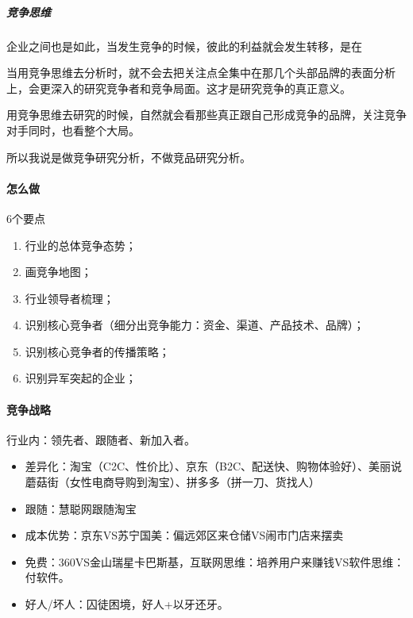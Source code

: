 \documentclass[letterpaper,10pt,english]{sphinxmanual}
\begin{document}
\subparagraph{竞争思维}
\label{\detokenize{chapter_knowledge/compete_analysis:id4}}
企业之间也是如此，当发生竞争的时候，彼此的利益就会发生转移，是在

当用竞争思维去分析时，就不会去把关注点全集中在那几个头部品牌的表面分析上，会更深入的研究竞争者和竞争局面。这才是研究竞争的真正意义。

用竞争思维去研究的时候，自然就会看那些真正跟自己形成竞争的品牌，关注竞争对手同时，也看整个大局。

所以我说是做竞争研究分析，不做竞品研究分析。%
\begin{footnote}[551]\sphinxAtStartFootnote
{}
%
\end{footnote}


\paragraph{怎么做}
\label{\detokenize{chapter_knowledge/compete_analysis:id5}}
6个要点
\begin{enumerate}
%
\item {} 
行业的总体竞争态势；

\item {} 
画竞争地图；

\item {} 
行业领导者梳理；

\item {} 
识别核心竞争者（细分出竞争能力：资金、渠道、产品技术、品牌）；

\item {} 
识别核心竞争者的传播策略；

\item {} 
识别异军突起的企业；

\end{enumerate}


\paragraph{竞争战略}
\label{\detokenize{chapter_knowledge/compete_analysis:id6}}
行业内：领先者、跟随者、新加入者。
\begin{itemize}
\item {} 
差异化：淘宝（C2C、性价比）、京东（B2C、配送快、购物体验好）、美丽说蘑菇街（女性电商导购到淘宝）、拼多多（拼一刀、货找人）

\item {} 
跟随：慧聪网跟随淘宝

\item {} 
成本优势：京东VS苏宁国美：偏远郊区来仓储VS闹市门店来摆卖

\item {} 
免费：360VS金山瑞星卡巴斯基，互联网思维：培养用户来赚钱VS软件思维：付软件。

\item {} 
好人/坏人：囚徒困境，好人+以牙还牙。

\end{itemize}
\end{document}
